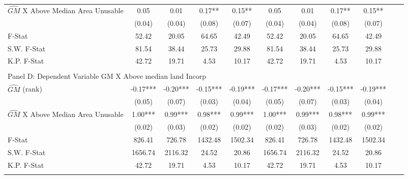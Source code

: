 \begin{table}[htbp]
\begin{threeparttable}
\begin{tabular}{l*{10}{c}}
\addlinespace
$\hat{GM}$ X Above Median Area Unusable&       0.05   &       0.01   &       0.17** &       0.15** &       0.05   &       0.01   &       0.17** &       0.15** \\
                &     (0.04)   &     (0.04)   &     (0.08)   &     (0.07)   &     (0.04)   &     (0.04)   &     (0.08)   &     (0.07)   \\
\midrule
F-Stat          &      52.42   &      20.05   &      64.65   &      42.49   &      52.42   &      20.05   &      64.65   &      42.49   \\
S.W. F-Stat     &      81.54   &      38.44   &      25.73   &      29.88   &      81.54   &      38.44   &      25.73   &      29.88   \\
K.P. F-Stat     &      42.72   &      19.71   &       4.53   &      10.17   &      42.72   &      19.71   &       4.53   &      10.17   \\
\cmidrule[\heavyrulewidth](lr){1-9} \\ \cmidrule[\heavyrulewidth](lr){1-9}
\multicolumn{8}{l}{Panel D: Dependent Variable GM X Above median land Incorp}\\
\cmidrule(lr){1-9}
$\hat{GM}$ (rank)&      -0.17***&      -0.20***&      -0.15***&      -0.19***&      -0.17***&      -0.20***&      -0.15***&      -0.19***\\
                &     (0.05)   &     (0.07)   &     (0.03)   &     (0.04)   &     (0.05)   &     (0.07)   &     (0.03)   &     (0.04)   \\
\addlinespace
$\hat{GM}$ X Above Median Area Unusable&       1.00***&       0.99***&       0.98***&       0.99***&       1.00***&       0.99***&       0.98***&       0.99***\\
                &     (0.02)   &     (0.03)   &     (0.02)   &     (0.02)   &     (0.02)   &     (0.03)   &     (0.02)   &     (0.02)   \\
\midrule
F-Stat          &     826.41   &     726.78   &    1432.48   &    1502.34   &     826.41   &     726.78   &    1432.48   &    1502.34   \\
S.W. F-Stat     &    1656.74   &    2116.32   &      24.52   &      20.86   &    1656.74   &    2116.32   &      24.52   &      20.86   \\
K.P. F-Stat     &      42.72   &      19.71   &       4.53   &      10.17   &      42.72   &      19.71   &       4.53   &      10.17   \\
\cmidrule[\heavyrulewidth](lr){1-9} \\ \cmidrule[\heavyrulewidth](lr){1-9}

\end{tabular}
\end{threeparttable}
\end{table}
